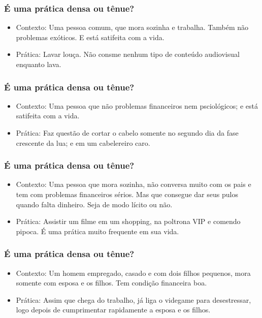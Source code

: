 \begin{frame}
	\frametitle{É uma prática densa ou tênue?}

    \begin{itemize}
        \item Contexto: Uma pessoa comum, que mora sozinha e trabalha. Também não problemas exóticos. E está satifeita com a vida.
        \item Prática: Lavar louça. Não consme nenhum tipo de conteúdo audiovisual enquanto lava.
    \end{itemize}
\end{frame}


\begin{frame}
	\frametitle{É uma prática densa ou tênue?}

    \begin{itemize}
        \item Contexto: Uma pessoa que não problemas financeiros nem psciológicos; e está satifeita com a vida.
        \item Prática: Faz questão de cortar o cabelo somente no segundo dia da fase crescente da lua; e em um cabelereiro caro.
    \end{itemize}
\end{frame}

\begin{frame}
	\frametitle{É uma prática densa ou tênue?}

    \begin{itemize}
        \item Contexto: Uma pessoa que mora sozinha, não conversa muito com os pais e tem com problemas financeiros sérios. Mas que consegue dar seus pulos quando falta dinheiro. Seja de modo lícito ou não.
        \item Prática: Assistir um filme em um shopping, na poltrona VIP e comendo pipoca. É uma prática muito frequente em sua vida.
    \end{itemize}
\end{frame}

\begin{frame}
	\frametitle{É uma prática densa ou tênue?}

    \begin{itemize}
        \item Contexto: Um homem empregado, casado e com dois filhos pequenos, mora somente com esposa e os filhos. Tem condição financeira boa.
        \item Prática: Assim que chega do trabalho, já liga o videgame para desestressar, logo depois de cumprimentar rapidamente a esposa e os filhos.
    \end{itemize}
\end{frame}

